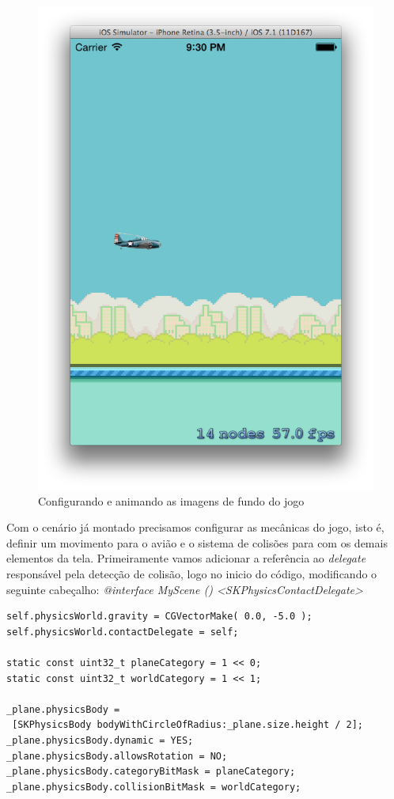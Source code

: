 \documentclass[a4paper,12pt,brazil,doubleside]{book}
\begin{document}
\begin{singlespace}
\begin{figure}[H]
  \centering
  \includegraphics[width=.75\textwidth]{figuras/6/plane5.png}
  \caption{Configurando e animando as imagens de fundo do jogo}
  \label{fig:a}
\end{figure}

Com o cenário já montado precisamos configurar as mecânicas do jogo, isto é, definir um movimento para o avião e o sistema de colisões para com os demais elementos da tela.
Primeiramente vamos adicionar a referência ao  \emph{delegate} responsável pela detecção de colisão, logo no inicio do código, modificando o seguinte cabeçalho: \emph{@interface MyScene () <SKPhysicsContactDelegate>}
 
\begin{listing}[H]
\begin{verbatim}
self.physicsWorld.gravity = CGVectorMake( 0.0, -5.0 );
self.physicsWorld.contactDelegate = self;
        
static const uint32_t planeCategory = 1 << 0;
static const uint32_t worldCategory = 1 << 1;

_plane.physicsBody = 
 [SKPhysicsBody bodyWithCircleOfRadius:_plane.size.height / 2];
_plane.physicsBody.dynamic = YES;
_plane.physicsBody.allowsRotation = NO;
_plane.physicsBody.categoryBitMask = planeCategory;
_plane.physicsBody.collisionBitMask = worldCategory;
 

\end{verbatim}
\end{listing}
\end{singlespace}
\end{document}
